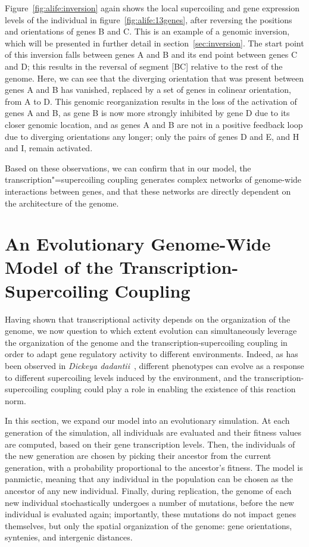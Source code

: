 Figure~\ref{fig:alife:inversion} again shows the local supercoiling and gene expression levels of the individual in figure~\ref{fig:alife:13genes}, after reversing the positions and orientations of genes B and C.
This is an example of a genomic inversion, which will be presented in further detail in section~\ref{sec:inversion}.
The start point of this inversion falls between genes A and B and its end point between genes C and D; this results in the reversal of segment [BC] relative to the rest of the genome.
Here, we can see that the diverging orientation that was present between genes A and B has vanished, replaced by a set of genes in colinear orientation, from A to D.
This genomic reorganization results in the loss of the activation of genes A and B, as gene B is now more strongly inhibited by gene D due to its closer genomic location, and as genes A and B are not in a positive feedback loop due to diverging orientations any longer; only the pairs of genes D and E, and H and I, remain activated.

Based on these observations, we can confirm that in our model, the transcription"=supercoiling coupling generates complex networks of genome-wide interactions between genes, and that these networks are directly dependent on the architecture of the genome.


\section{An Evolutionary Genome-Wide Model of the Transcription-Supercoiling Coupling}
\label{sec:alife:evol_model}

Having shown that transcriptional activity depends on the organization of the genome, we now question to which extent evolution can simultaneously leverage the organization of the genome and the transcription-supercoiling coupling in order to adapt gene regulatory activity to different environments.
Indeed, as has been observed in \emph{Dickeya dadantii}~\citep{muskhelishvili2019}, different phenotypes can evolve as a response to different supercoiling levels induced by the environment, and the transcription-supercoiling coupling could play a role in enabling the existence of this reaction norm.

In this section, we expand our model into an evolutionary simulation.
At each generation of the simulation, all individuals are evaluated and their fitness values are computed, based on their gene transcription levels.
Then, the individuals of the new generation are chosen by picking their ancestor from the current generation, with a probability proportional to the ancestor's fitness.
The model is panmictic, meaning that any individual in the population can be chosen as the ancestor of any new individual.
Finally, during replication, the genome of each new individual stochastically undergoes a number of mutations, before the new individual is evaluated again; importantly, these mutations do not impact genes themselves, but only the spatial organization of the genome: gene orientations, syntenies, and intergenic distances.

